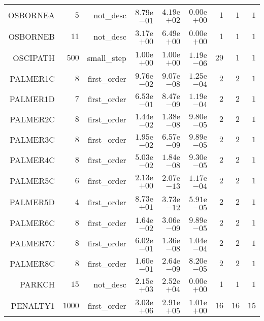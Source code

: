 \begin{longtable}{rrrrrrrrr}
OSBORNEA & \(     5\) & not\_desc & \( 8.79\)e\(-01\) & \( 4.19\)e\(+02\) & \( 0.00\)e\(+00\) & \(     1\) & \(     1\) & \(     1\) \\
OSBORNEB & \(    11\) & not\_desc & \( 3.17\)e\(+00\) & \( 6.49\)e\(+00\) & \( 0.00\)e\(+00\) & \(     1\) & \(     1\) & \(     1\) \\
OSCIPATH & \(   500\) & small\_step & \( 1.00\)e\(+00\) & \( 1.00\)e\(+00\) & \( 1.19\)e\(-06\) & \(    29\) & \(     1\) & \(     1\) \\
PALMER1C & \(     8\) & first\_order & \( 9.76\)e\(-02\) & \( 9.07\)e\(-08\) & \( 1.25\)e\(-04\) & \(     2\) & \(     2\) & \(     1\) \\
PALMER1D & \(     7\) & first\_order & \( 6.53\)e\(-01\) & \( 8.47\)e\(-09\) & \( 1.19\)e\(-04\) & \(     2\) & \(     2\) & \(     1\) \\
PALMER2C & \(     8\) & first\_order & \( 1.44\)e\(-02\) & \( 1.38\)e\(-08\) & \( 9.80\)e\(-05\) & \(     2\) & \(     2\) & \(     1\) \\
PALMER3C & \(     8\) & first\_order & \( 1.95\)e\(-02\) & \( 6.57\)e\(-09\) & \( 9.89\)e\(-05\) & \(     2\) & \(     2\) & \(     1\) \\
PALMER4C & \(     8\) & first\_order & \( 5.03\)e\(-02\) & \( 1.84\)e\(-08\) & \( 9.30\)e\(-05\) & \(     2\) & \(     2\) & \(     1\) \\
PALMER5C & \(     6\) & first\_order & \( 2.13\)e\(+00\) & \( 2.07\)e\(-13\) & \( 1.17\)e\(-04\) & \(     2\) & \(     2\) & \(     1\) \\
PALMER5D & \(     4\) & first\_order & \( 8.73\)e\(+01\) & \( 3.73\)e\(-12\) & \( 5.91\)e\(-05\) & \(     2\) & \(     2\) & \(     1\) \\
PALMER6C & \(     8\) & first\_order & \( 1.64\)e\(-02\) & \( 3.06\)e\(-09\) & \( 9.89\)e\(-05\) & \(     2\) & \(     2\) & \(     1\) \\
PALMER7C & \(     8\) & first\_order & \( 6.02\)e\(-01\) & \( 1.36\)e\(-08\) & \( 1.04\)e\(-04\) & \(     2\) & \(     2\) & \(     1\) \\
PALMER8C & \(     8\) & first\_order & \( 1.60\)e\(-01\) & \( 2.64\)e\(-09\) & \( 8.20\)e\(-05\) & \(     2\) & \(     2\) & \(     1\) \\
PARKCH & \(    15\) & not\_desc & \( 2.15\)e\(+03\) & \( 2.52\)e\(+04\) & \( 0.00\)e\(+00\) & \(     1\) & \(     1\) & \(     1\) \\
PENALTY1 & \(  1000\) & first\_order & \( 3.03\)e\(+06\) & \( 2.91\)e\(+05\) & \( 1.01\)e\(+00\) & \(    16\) & \(    16\) & \(    15\) \\

\end{longtable}
